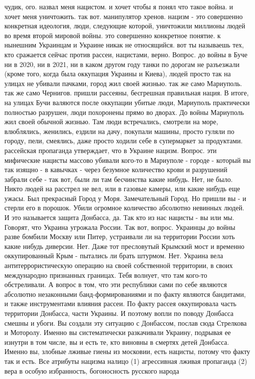 чудик, ого. назвал меня нацистом. и хочет чтобы я понял что такое война. и
хочет меня уничтожить. так вот. манипулятор хренов. нацизм - это совершенно
конкретная идеология, люди, следующие которой, уничтожили миллионы людей во
время второй мировой войны. это совершенно конкретное понятие. к нынешним
Украинцам и Украине никак не относящийся. вот ты называешь тех, кто сражается
сейчас против рассеи, нацистами, верно. Вопрос. до войны в Буче ни в 2020, ни в
2021, ни в каком другом году танки по дорогам не разъезжали (кроме того, когда
была оккупация Украины и Киева), людей просто так на улицах не убивали пачками,
город жил своей жизнью. так же само Мариуполь. так же само Чернигов. пришли
рассеяны, бесгрешная правильная нация. В итоге, на улицах Бучи валяются после
оккупации убитые люди, Мариуполь практически полностью разрушен, люди
похоронены прямо во дворах. До войны Мариуполь жил своей обычной жизнью. Там
люди встречались, смотрели на море, влюблялись, женились, ездили на дачу,
покупали машины, просто гуляли по городу, пели, смеялись, даже просто ходили
себе в супермаркет за продуктами. рассейская пропаганда утверждает, что в
Украине нацизм. Вопрос. эти мифические нацисты массово убивали кого-то в
Мариуполе - городе - который вы так изящно - в кавычках - через безумное
количество крови и разрушений забрали себе - так вот, были ли там бесчинства
какие нибудь. Нет, не было. Никто людей на расстрел не вел, или в газовые
камеры, или какие нибудь еще ужасы. Был прекрасный Город у Моря. Замечательный
Город. Но пришли вы - и стерли его в порошок. Убили огромное количество
абсолютно невинных людей. И это называется защита Донбасса, да. Так кто из нас
нацисты - вы или мы. Говорят, что Украина угрожала России. Так вот, вопрос.
Украинцы до войны разве бомбили Москву или Питер, устраивали ли на территории
России хоть какие нибудь диверсии. Нет. Даже тот пресловутый Крымский мост и
временно оккупированный Крым - пытались ли брать штурмом. Нет. Украина вела
антитеррористическую операцию на своей собственной территории, в своих
международно признанных границах. Тебя волнует, что там кого-то обстреливали. А
вопрос в том, что эти республики сами по себе являются абсолютно незаконными
банд-формированиями и по факту являются бандитами, и также инструментами
влияния рассеи. По факту рассея оккупировала часть территории Донбасса, части
Украины. И поэтому вопли по поводу Донбасса смешны и убоги. Вы создали эту
ситуацию с Донбассом, послав сюда Стрелкова и Моторолу. Именно вы
систематически разкачивали Украину, подрывая ее изнутри в том числе, вы и есть
те, кто виновны в смертях детей Донбасса. Именно вы, злобные лживые гиены из
московии, есть нацисты, потому что факту так и есть. Все атрибуты нацизма
налицо (1) агрессивная лживая пропаганда (2) вера в особую избранность,
богоносность русского народа

